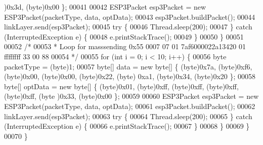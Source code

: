 \begin{DoxyCode}
      )0x3d, (byte)0x00 \};
00041 
00042             ESP3Packet esp3Packet = \textcolor{keyword}{new} ESP3Packet(packetType, data, optData);
00043             esp3Packet.buildPacket();
00044             linkLayer.send(esp3Packet);
00045             \textcolor{keywordflow}{try} \{
00046                 Thread.sleep(200);
00047             \} \textcolor{keywordflow}{catch} (InterruptedException e) \{
00048                 e.printStackTrace();
00049             \}
00050         \}
00051 
00052         \textcolor{comment}{/*}
00053 \textcolor{comment}{        * Loop for masssending 0x55 0007 07 01 7af6000022a13420 01 ffffffff 33 00 88}
00054 \textcolor{comment}{        */}
00055         \textcolor{keywordflow}{for} (\textcolor{keywordtype}{int} i = 0; i < 10; i++) \{
00056             byte packetType = (byte)1;
00057             byte[] data = \textcolor{keyword}{new} byte[] \{ (byte)0x7a, (byte)0xf6, (byte)0x00, (byte)0x00, (byte)0x22, (byte)
      0xa1, (byte)0x34, (byte)0x20 \};
00058             byte[] optData = \textcolor{keyword}{new} byte[] \{ (byte)0x01, (byte)0xff, (byte)0xff, (byte)0xff, (byte)0xff, (byte
      )0x33, (byte)0x00 \};
00059 
00060             ESP3Packet esp3Packet = \textcolor{keyword}{new} ESP3Packet(packetType, data, optData);
00061             esp3Packet.buildPacket();
00062             linkLayer.send(esp3Packet);
00063             \textcolor{keywordflow}{try} \{
00064                 Thread.sleep(200);
00065             \} \textcolor{keywordflow}{catch} (InterruptedException e) \{
00066                 e.printStackTrace();
00067             \}
00068         \}
00069     \}
00070 \}
\end{DoxyCode}
